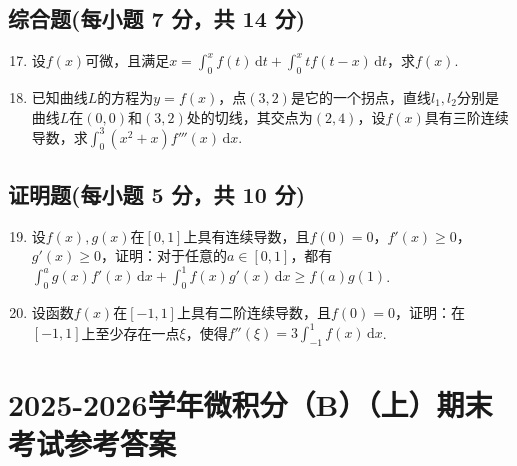 \documentclass[../main.tex]{subfiles}
\begin{document}
\section{综合题(每小题 7 分，共 14 分)}
\begin{enumerate}
    \setcounter{enumi}{16}
    \item 设$f(x)$可微，且满足$x=\int_{0}^{x}f(t)\,\mathrm{d}t+\int_{0}^{x}tf(
              t-x)\,\mathrm{d}t$，求$f(x)$.
          \vspace{12em}

    \item 已知曲线$L$的方程为$y=f(x)$，点$(3,2)$是它的一个拐点，直线$l_{1},l
                  _{2}$分别是曲线$L$在$(0,0)$和$(3,2)$处的切线，其交点为$(2,4)$，设$f(x)$具有三阶连续导数，求$\int
              _{0}^{3}(x^{2}+x)f'''(x)\,\mathrm{d}x$.
          \vspace{13em}
\end{enumerate}

\section{证明题(每小题 5 分，共 10 分)}
\begin{enumerate}
    \setcounter{enumi}{18}
    \item 设$f(x),g(x)$在$[0,1]$上具有连续导数，且$f(0)=0$，$f'(x)\geq 0$，$g
              '(x)\geq 0$，证明：对于任意的$a\in[0,1]$，都有$\int_{0}^{a}g(x)f'(x)\,\mathrm{d}
              x+\int_{0}^{1}f(x)g'(x)\,\mathrm{d}x\geq f(a)g(1)$.
          \vspace{15em}

    \item 设函数$f(x)$在$[-1,1]$上具有二阶连续导数，且$f(0)=0$，证明：在$[-1
                  ,1]$上至少存在一点$\xi$，使得$f''(\xi)=3\int_{-1}^{1}f(x)\,\mathrm{d}x$.
          \vspace{15em}
\end{enumerate}

\chapter{2025-2026学年微积分（B）（上）期末考试参考答案}
\end{document}
